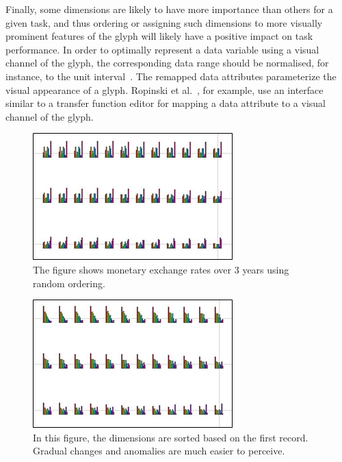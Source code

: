 Finally, some dimensions are likely to have more importance than others for a given task, and thus ordering or assigning such dimensions to more visually prominent features of the glyph will likely have a positive impact on task performance. 
In order to optimally represent a data variable using a visual channel of the glyph, the corresponding data range should be normalised, for instance, to the unit interval~\cite{Ropinski11glyphs, ward02glyphPlacement, lie09glyphs}.
The remapped data attributes parameterize the visual appearance of a glyph.
Ropinski et al.~\cite{ropinski07surfaceglyphs}, for example,
use an interface similar to a transfer function editor for mapping a data attribute to a visual channel of the glyph.
\begin{figure}[!t]
\includegraphics[width=\columnwidth]{images/related-work-glyphs/mWard1.png}
\caption{The figure shows monetary exchange rates over 3 years using random ordering.\label{fig:mWard1}}
\end{figure}
\begin{figure}[!t]
\includegraphics[width=\columnwidth]{images/related-work-glyphs/mWard2.png}
\caption{In this figure, the dimensions are sorted based on the first record.  Gradual changes and anomalies are much easier to perceive.\label{fig:mWard2}}
\end{figure}

